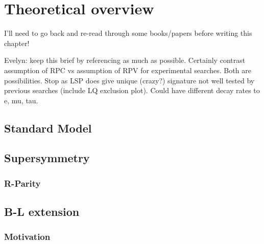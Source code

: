 \chapter[Theoretical overview][Theory]{Theoretical overview}
\label{ch:theory}

{\color{red} I'll need to go back and re-read through some books/papers before
  writing this chapter!}

{\color{red} Evelyn: 
keep this brief by referencing as much as possible.  Certainly contrast
assumption of RPC vs assumption of RPV for experimental searches.  Both are
possibilities.  Stop as LSP does give unique (crazy?) signature not well
tested by previous searches (include LQ exclusion plot).  Could have different
decay rates to e, mu, tau.
}

\section{Standard Model}

\section{Supersymmetry}

\subsection{R-Parity}

\section{B-L extension}
\label{sec:theory_bl_extension}

\subsection{Motivation}

